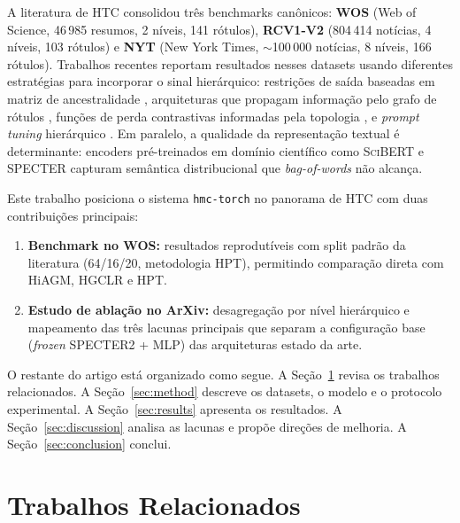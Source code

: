 \documentclass[11pt,a4paper,twoside]{article}
\begin{document}
A literatura de HTC consolidou três benchmarks canônicos: \textbf{WOS} (Web of Science,
46\,985 resumos, 2 níveis, 141 rótulos), \textbf{RCV1-V2} (804\,414 notícias, 4 níveis,
103 rótulos) e \textbf{NYT} (New York Times, $\sim$100\,000 notícias, 8 níveis, 166
rótulos). Trabalhos recentes reportam resultados nesses datasets usando diferentes
estratégias para incorporar o sinal hierárquico: restrições de saída baseadas em
matriz de ancestralidade \cite{giunchiglia2020coherent}, arquiteturas que propagam
informação pelo grafo de rótulos \cite{zhou2020hiagm}, funções de perda contrastivas
informadas pela topologia \cite{wang2022hgclr}, e \textit{prompt tuning} hierárquico
\cite{wang2022hpt}. Em paralelo, a qualidade da representação textual é determinante:
encoders pré-treinados em domínio científico como \textsc{SciBERT}
\cite{beltagy2019scibert} e \textsc{SPECTER} \cite{cohan2020specter} capturam
semântica distribucional que \textit{bag-of-words} não alcança.

Este trabalho posiciona o sistema \texttt{hmc-torch} no panorama de HTC com duas
contribuições principais:

\begin{enumerate}[leftmargin=*, itemsep=2pt]
  \item \textbf{Benchmark no WOS:} resultados reprodutíveis com split padrão da
        literatura (64/16/20, metodologia HPT), permitindo comparação direta com
        HiAGM, HGCLR e HPT.
  \item \textbf{Estudo de ablação no ArXiv:} desagregação por nível hierárquico
        e mapeamento das três lacunas principais que separam a configuração base
        (\textit{frozen} SPECTER2 + MLP) das arquiteturas estado da arte.
\end{enumerate}

O restante do artigo está organizado como segue. A Seção~\ref{sec:related} revisa
os trabalhos relacionados. A Seção~\ref{sec:method} descreve os datasets, o modelo
e o protocolo experimental. A Seção~\ref{sec:results} apresenta os resultados. A
Seção~\ref{sec:discussion} analisa as lacunas e propõe direções de melhoria. A
Seção~\ref{sec:conclusion} conclui.

\section{Trabalhos Relacionados}
\label{sec:related}
\end{document}

